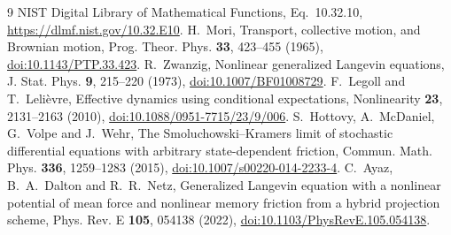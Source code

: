 \documentclass[11pt]{article}
\begin{document}
\begin{thebibliography}{9}
 NIST Digital Library of Mathematical Functions,
Eq.~10.32.10, \url{https://dlmf.nist.gov/10.32.E10}.
 H.~Mori, Transport, collective motion, and Brownian motion,
Prog. Theor. Phys. \textbf{33}, 423--455 (1965),
\href{https://doi.org/10.1143/PTP.33.423}{doi:10.1143/PTP.33.423}.
 R.~Zwanzig, Nonlinear generalized Langevin equations,
J. Stat. Phys. \textbf{9}, 215--220 (1973),
\href{https://doi.org/10.1007/BF01008729}{doi:10.1007/BF01008729}.
 F.~Legoll and T.~Leli\`evre, Effective dynamics using
conditional expectations, Nonlinearity \textbf{23}, 2131--2163 (2010),
\href{https://doi.org/10.1088/0951-7715/23/9/006}{doi:10.1088/0951-7715/23/9/006}.
 S.~Hottovy, A.~McDaniel, G.~Volpe and J.~Wehr,
The Smoluchowski--Kramers limit of stochastic differential equations with
arbitrary state-dependent friction, Commun. Math. Phys. \textbf{336},
1259--1283 (2015),
\href{https://doi.org/10.1007/s00220-014-2233-4}{doi:10.1007/s00220-014-2233-4}.
 C.~Ayaz, B.~A.~Dalton and R.~R.~Netz, Generalized
Langevin equation with a nonlinear potential of mean force and nonlinear
memory friction from a hybrid projection scheme,
Phys. Rev. E \textbf{105}, 054138 (2022),
\href{https://doi.org/10.1103/PhysRevE.105.054138}{doi:10.1103/PhysRevE.105.054138}.
\end{thebibliography}
\end{document}

